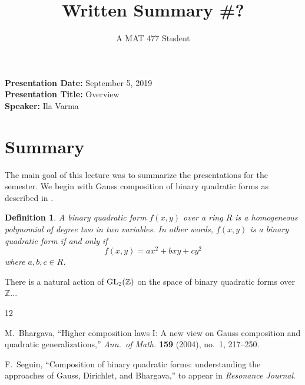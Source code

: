 \documentclass[10pt]{amsart} %
\title{Written Summary \#?}
\author{A MAT 477 Student}
\newtheorem{definition}[theorem]{Definition}
\newcommand{\GL}{{\rm GL}}
\begin{document}
\maketitle %

\vspace{-20pt}
{\bf Presentation Date:} September 5, 2019  \\
{\bf Presentation Title:} Overview\\
{\bf Speaker:} Ila Varma 
\vspace{-20pt}

\section*{Summary} %

The main goal of this lecture was to summarize the presentations for the semester. We begin with Gauss composition of binary quadratic forms as described in \cite{Seguin}.

\begin{definition}
A {\em binary quadratic form} $f(x,y)$ over a ring $R$ is a homogeneous polynomial of degree two in two variables. In other words, $f(x,y)$ is a binary quadratic form if and only if
$$f(x,y) = ax^2 + bxy + cy^2$$ %
where $a,b,c \in R$. 
\end{definition}

There is a natural action of $\GL_2(\mathbb{Z})$ on the space of binary quadratic forms over $\mathbb{Z}$...

\newpage

\begin{thebibliography}{12}%

M.\ Bhargava, ``Higher composition laws I: A new view on Gauss composition and quadratic generalizations,'' {\it Ann.\ of Math.} {\bf 159} (2004), no.\ 1, 217--250.


F.\ Seguin, ``Composition of binary quadratic forms: understanding the approaches of Gauss, Dirichlet, and Bhargava,'' to appear in {\it Resonance Journal}.

\end{thebibliography}
\end{document}
